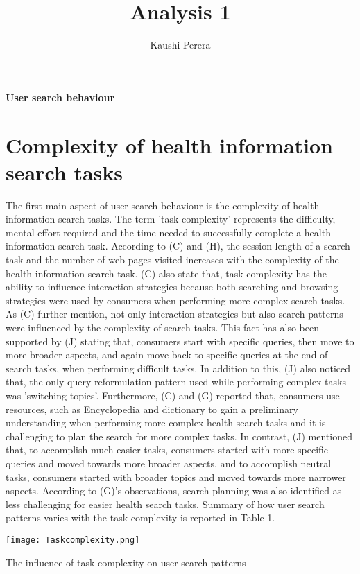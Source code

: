 \documentclass[]{article}
\title{Analysis 1}
\author{Kaushi Perera}
\begin{document}
	
\maketitle
	
	
\textbf{User search behaviour}


\section{Complexity of health information search tasks} 

The first main aspect of user search behaviour is the complexity of health information search tasks. The term 'task complexity' represents the difficulty, mental effort required and the time needed to successfully complete a health information search task. According to (C) and (H), the session length of a search task and the number of web pages visited increases with the complexity of the health information search task. (C) also state that, task complexity has the ability to influence interaction strategies because both searching and browsing strategies were used by consumers when performing more complex search tasks. As (C) further mention, not only interaction strategies but also search patterns were influenced by the complexity of search tasks. This fact has also been supported by (J) stating that,  consumers start with specific queries, then move to more broader aspects, and again move back to specific queries at the end of search tasks, when performing difficult tasks. In addition to this, (J) also noticed that, the only query reformulation pattern used while performing complex tasks was 'switching topics'. Furthermore, (C) and (G) reported that, consumers use resources, such as Encyclopedia and dictionary to gain a preliminary understanding when performing more complex health search tasks and it is challenging to plan the search for more complex tasks. In contrast, (J) mentioned that, to accomplish much easier tasks, consumers started with more specific queries and moved towards more broader aspects, and to accomplish neutral tasks, consumers started with broader topics and moved towards more narrower aspects. According to (G)'s observations, search planning was also identified as less challenging for easier health search tasks. Summary of how user search patterns varies with the task complexity is reported in Table 1. 

\begin{table}[t!]
	\texttt{[image: Taskcomplexity.png]}
	\caption{The influence of task complexity on user search patterns\label{tabel1}}
\end{table} 
\end{document}
